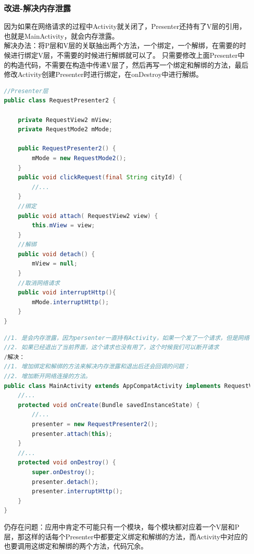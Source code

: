 \documentclass[a4paper,12pt]{ctexart}
\begin{document}
\subsubsection{改进-解决内存泄露}
\noindent 因为如果在网络请求的过程中Activity就关闭了，Presenter还持有了V层的引用，也就是MainActivity，就会内存泄露。
\\ 解决办法：将P层和V层的关联抽出两个方法，一个绑定，一个解绑，在需要的时候进行绑定V层，不需要的时候进行解绑就可以了。
只需要修改上面Presenter中的构造代码，不需要在构造中传递V层了，然后再写一个绑定和解绑的方法，最后修改Activity创建Presenter时进行绑定，在onDestroy中进行解绑。
\begin{lstlisting}[language=java]
//Presenter层
public class RequestPresenter2 {
	
	private RequestView2 mView;
	private RequestMode2 mMode;
	
	public RequestPresenter2() {
		mMode = new RequestMode2();
	}
	public void clickRequest(final String cityId) {
		//...
	}
	//绑定
	public void attach( RequestView2 view) {
		this.mView = view;
	}
	//解绑
	public void detach() {
		mView = null;
	}
	//取消网络请求
	public void interruptHttp(){
		mMode.interruptHttp();
	}
}
\end{lstlisting}
\begin{lstlisting}[language=java]
//1. 是会内存泄露，因为persenter一直持有Activity，如果一个发了一个请求，但是网络有点慢，这个时候退出Activity，那么请求回来后还是会调用Activity的回调方法，这里还是因为一直持有的问题。
//2. 如果已经退出了当前界面，这个请求也没有用了，这个时候我们可以断开请求
/解决：
//1. 增加绑定和解绑的方法来解决内存泄露和退出后还会回调的问题；
//2. 增加断开网络连接的方法。
public class MainActivity extends AppCompatActivity implements RequestView2 {
	//...
	protected void onCreate(Bundle savedInstanceState) {
		//...
		presenter = new RequestPresenter2();
		presenter.attach(this);
	}
	//...
	protected void onDestroy() {
		super.onDestroy();
		presenter.detach();
		presenter.interruptHttp();
	}
}
\end{lstlisting}
\par 仍存在问题：应用中肯定不可能只有一个模块，每个模块都对应着一个V层和P层，那这样的话每个Presenter中都要定义绑定和解绑的方法，而Activity中对应的也要调用这绑定和解绑的两个方法，代码冗余。
\end{document}
